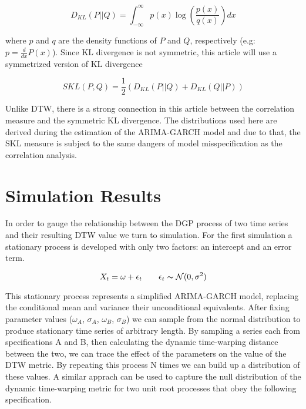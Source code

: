 \documentclass[12pt]{article}
\begin{document}
\begin{equation}
    D_{KL}(P || Q) = \int_{-\infty}^{\infty} p(x) \log \left( \frac{p(x)}{q(x)} \right) dx
\end{equation}

where $p$ and $q$ are the density functions of $P$ and $Q$, respectively (e.g: $p = \frac{d}{dx}P(x)$). Since KL divergence is not symmetric, this article will use a symmetrized version of KL divergence

\begin{equation}
    SKL(P, Q) = \frac{1}{2} \left( D_{KL}(P || Q) + D_{KL}(Q || P) \right)
\end{equation}

Unlike DTW, there is a strong connection in this article between the correlation measure and the symmetric KL divergence. The distributions used here are derived during the estimation of the ARIMA-GARCH model and due to that, the SKL measure is subject to the same dangers of model misspecification as the correlation analysis.


\section{Simulation Results}
In order to gauge the relationship between the DGP process of two time series and their resulting DTW value we turn to simulation. For the first simulation a stationary process is developed with only two factors: an intercept and an error term.

\begin{equation}
    X_{t} = \omega + \epsilon_{t} \qquad \epsilon_{t} \thicksim \mathcal{N}(0, \sigma^{2})
\end{equation}

This stationary process represents a simplified ARIMA-GARCH model, replacing the conditional mean and variance their unconditional equivalents. After fixing parameter values ($\omega_{A}$, $\sigma_{A}$, $\omega_{B}$, $\sigma_{B}$) we can sample from the normal distribution to produce stationary time series of arbitrary length. By sampling a series each from specifications A and B, then calculating the dynamic time-warping distance between the two, we can trace the effect of the parameters on the value of the DTW metric. By repeating this process N times we can build up a distribution of these values. A similar apprach can be used to capture the null distribution of the dynamic time-warping metric for two unit root processes that obey the following specification.
\end{document}
